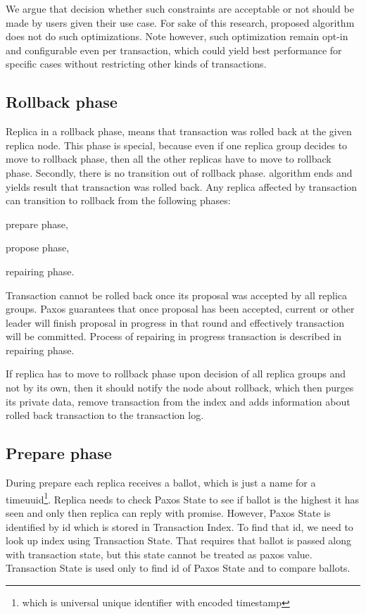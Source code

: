  We argue that decision whether such constraints are acceptable or not should be made by users given their use case. For sake of this research, proposed algorithm does not do such optimizations. Note however, such optimization remain opt-in and configurable even per transaction, which could yield best performance for specific cases without restricting other kinds of transactions.
       

\subsection{Rollback phase}
Replica in a rollback phase, means that transaction was rolled back at the given replica node. 
This phase is special, because even if one replica group decides to move to rollback phase, then all the other replicas have to move to rollback phase. Secondly, there is no transition out of rollback phase. \mpt algorithm ends and yields result that transaction was rolled back.
Any replica affected by transaction can transition to rollback  from the following phases: \begin{enumerate*}
\item prepare phase,
\item propose phase,
\item repairing phase.
\end{enumerate*}

Transaction cannot be rolled back once its proposal was accepted by all replica groups. Paxos guarantees that once proposal has been accepted, current or other leader will finish proposal in progress in that round and effectively transaction will be committed. Process of repairing in progress transaction is described in repairing phase.

If replica has to move to rollback phase upon decision of all replica groups and not by its own, then it should notify the node about rollback, which then purges its private data, remove transaction from the index and adds information about rolled back transaction to the transaction log.


\subsection{Prepare phase}
During prepare each replica receives a ballot, which is just a name for a timeuuid\footnote{which is universal unique identifier with encoded timestamp}. Replica needs to check Paxos State to see if ballot is the highest it has seen and only then replica can reply with promise. However, Paxos State is identified by id which is stored in Transaction Index. To find that id, we need to look up index using Transaction State. That requires that ballot is passed along with transaction state, but this state cannot be treated as paxos value. Transaction State is used only to find id of Paxos State and to compare ballots.

